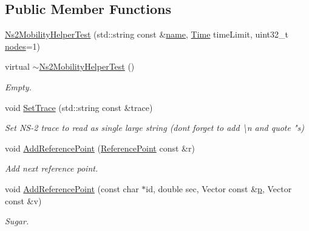 \subsection*{Public Member Functions}
\begin{DoxyCompactItemize}
\item 
\hyperlink{classNs2MobilityHelperTest_ac2293fea78abe49683b222a857034ae1}{Ns2\+Mobility\+Helper\+Test} (std\+::string const \&\hyperlink{generate__test__data__lte__spectrum__model_8m_ab74e6bf80237ddc4109968cedc58c151}{name}, \hyperlink{classns3_1_1Time}{Time} time\+Limit, uint32\+\_\+t \hyperlink{visualizer-ideas_8txt_a3e1b3808014a2c68ab0cd0182e041be2}{nodes}=1)
\item 
virtual \hyperlink{classNs2MobilityHelperTest_ac341ed3ee4006ebfacfad532fc6608dd}{$\sim$\+Ns2\+Mobility\+Helper\+Test} ()
\begin{DoxyCompactList}\small\item\em Empty. \end{DoxyCompactList}\item 
void \hyperlink{classNs2MobilityHelperTest_aa09d98189a8e0797c0fa8f197071758c}{Set\+Trace} (std\+::string const \&trace)
\begin{DoxyCompactList}\small\item\em Set N\+S-\/2 trace to read as single large string (don\textquotesingle{}t forget to add \textbackslash{}n and quote "\textquotesingle{}s) \end{DoxyCompactList}\item 
void \hyperlink{classNs2MobilityHelperTest_a8ee4cd8ee100580f80b5c95c5dabcf73}{Add\+Reference\+Point} (\hyperlink{structNs2MobilityHelperTest_1_1ReferencePoint}{Reference\+Point} const \&r)
\begin{DoxyCompactList}\small\item\em Add next reference point. \end{DoxyCompactList}\item 
void \hyperlink{classNs2MobilityHelperTest_a25d2e23f6e4230a9cab888d264269c62}{Add\+Reference\+Point} (const char $\ast$id, double sec, Vector const \&\hyperlink{lte__link__budget__x2__handover__measures_8m_ac9de518908a968428863f829398a4e62}{p}, Vector const \&v)
\begin{DoxyCompactList}\small\item\em Sugar. \end{DoxyCompactList}\end{DoxyCompactItemize}
